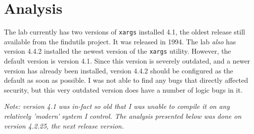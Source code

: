 \documentclass{article}
\newcommand{\xargs}{\texttt{xargs} }
\begin{document}
\section{Analysis}
The lab currently has two versions of \xargs installed 4.1, the oldest
release still available from the findutils project. It was released in 1994. The
lab \textit{also} has version 4.4.2 installed the newest version of the \xargs
utility. However, the default version is version 4.1. Since this version is
severely outdated, and a newer version has already been installed, version 4.4.2
should be configured as the default as soon as possible. I was not able to find
any bugs that directly affected security, but this very outdated version does
have a number of logic bugs in it.

\begin{center}
\parbox[c][1cm][c]{0.8\linewidth}{
    {\it Note: version 4.1 was in-fact so old that I was unable to compile it
     on any relatively 'modern' system I control. The analysis presented below
     was done on version 4.2.25, the next release version.}
}
\end{center}
\end{document}
